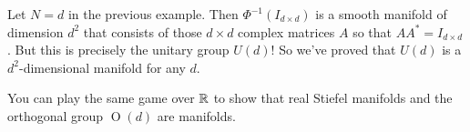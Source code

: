 	\begin{example}
		Let $N=d$ in the previous example. Then $\Phi^{-1}(I_{d \times d})$ is a smooth manifold of dimension $d^2$ that consists of those $d \times d$ complex matrices $A$ so that $AA^\ast = I_{d \times d}$. But this is precisely the unitary group $U(d)$! So we've proved that $U(d)$ is a $d^2$-dimensional manifold for any $d$.
	\end{example}
	
	\begin{remark}
		You can play the same game over $\mathbb{R}$ to show that real Stiefel manifolds and the orthogonal group $\operatorname{O}(d)$ are manifolds.
	\end{remark}
